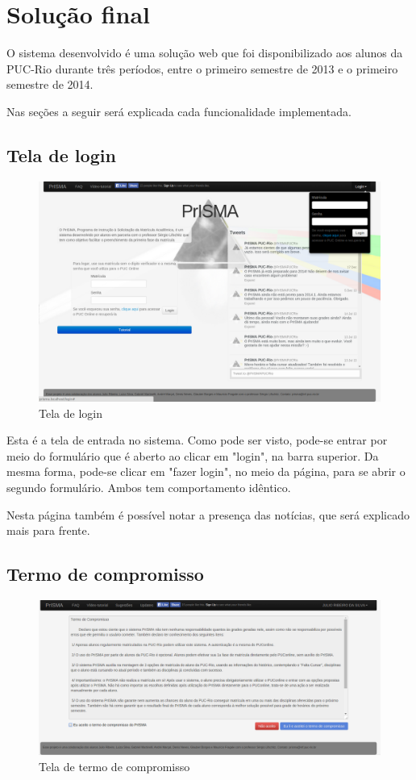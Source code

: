 \documentclass[graduacao,brazil]{ThesisPUC}
\begin{document}
\chapter{Solução final}

O sistema desenvolvido é uma solução web que foi disponibilizado aos alunos da PUC-Rio durante três períodos, entre o primeiro semestre de 2013 e o primeiro semestre de 2014. 

Nas seções a seguir será explicada cada funcionalidade implementada.

\section{Tela de login}

\begin{figure}[H]
    \centering
    \includegraphics[width=0.9\linewidth]{img/v3_tela_login.png}
    \caption{Tela de login}
\end{figure}

Esta é a tela de entrada no sistema. Como pode ser visto, pode-se entrar por meio do formulário que é aberto ao clicar em "login", na barra superior. Da mesma forma, pode-se clicar em "fazer login", no meio da página, para se abrir o segundo formulário. Ambos tem comportamento idêntico. 

Nesta página também é possível notar a presença das notícias, que será explicado mais para frente.

\section{Termo de compromisso}

\begin{figure}[H]
    \centering
    \includegraphics[width=\linewidth]{img/v3_tela_termo.png}
    \caption{Tela de termo de compromisso}
\end{figure}
\end{document}

